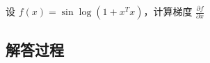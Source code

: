 \begin{example}[复合函数梯度]
    设 \(f(x) = \sin \log(1 + x^T x)\)，计算梯度 \(\frac{\partial f}{\partial x}\)
    \end{example}
    
    \subsection*{解答过程}
    